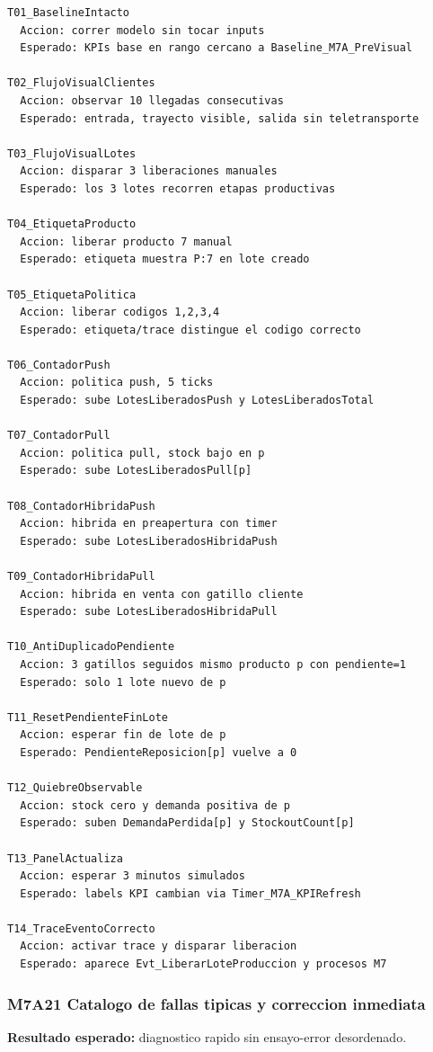 \documentclass[11pt]{article}
\begin{document}
\begin{lstlisting}[caption={Matriz extendida de pruebas manuales M7A}]
T01_BaselineIntacto
  Accion: correr modelo sin tocar inputs
  Esperado: KPIs base en rango cercano a Baseline_M7A_PreVisual

T02_FlujoVisualClientes
  Accion: observar 10 llegadas consecutivas
  Esperado: entrada, trayecto visible, salida sin teletransporte

T03_FlujoVisualLotes
  Accion: disparar 3 liberaciones manuales
  Esperado: los 3 lotes recorren etapas productivas

T04_EtiquetaProducto
  Accion: liberar producto 7 manual
  Esperado: etiqueta muestra P:7 en lote creado

T05_EtiquetaPolitica
  Accion: liberar codigos 1,2,3,4
  Esperado: etiqueta/trace distingue el codigo correcto

T06_ContadorPush
  Accion: politica push, 5 ticks
  Esperado: sube LotesLiberadosPush y LotesLiberadosTotal

T07_ContadorPull
  Accion: politica pull, stock bajo en p
  Esperado: sube LotesLiberadosPull[p]

T08_ContadorHibridaPush
  Accion: hibrida en preapertura con timer
  Esperado: sube LotesLiberadosHibridaPush

T09_ContadorHibridaPull
  Accion: hibrida en venta con gatillo cliente
  Esperado: sube LotesLiberadosHibridaPull

T10_AntiDuplicadoPendiente
  Accion: 3 gatillos seguidos mismo producto p con pendiente=1
  Esperado: solo 1 lote nuevo de p

T11_ResetPendienteFinLote
  Accion: esperar fin de lote de p
  Esperado: PendienteReposicion[p] vuelve a 0

T12_QuiebreObservable
  Accion: stock cero y demanda positiva de p
  Esperado: suben DemandaPerdida[p] y StockoutCount[p]

T13_PanelActualiza
  Accion: esperar 3 minutos simulados
  Esperado: labels KPI cambian via Timer_M7A_KPIRefresh

T14_TraceEventoCorrecto
  Accion: activar trace y disparar liberacion
  Esperado: aparece Evt_LiberarLoteProduccion y procesos M7
\end{lstlisting}

\subsubsection{M7A21 Catalogo de fallas tipicas y correccion inmediata}
\textbf{Resultado esperado:} diagnostico rapido sin ensayo-error desordenado.
\end{document}
